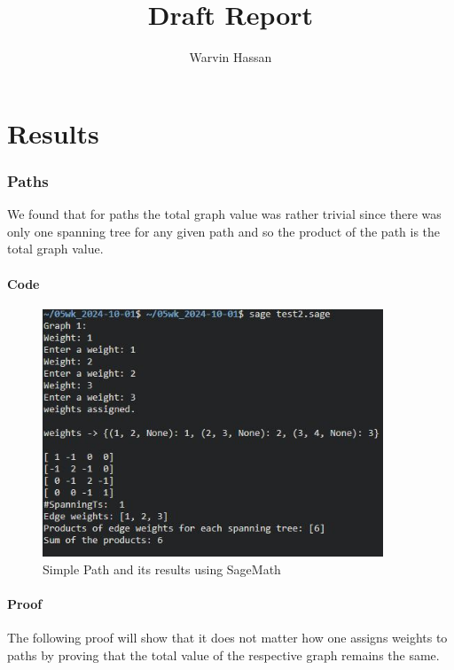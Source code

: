 \documentclass[12pt,letterpaper]{article}
\title{Draft Report}
\author{Warvin Hassan}
\begin{document}
\maketitle
\pagebreak
\tableofcontents
\pagebreak

\part{Results}

\section{Paths}  \label{P}

We found that for paths the total graph value was rather trivial since there was only one spanning tree for any given path and so the product of the path is the total graph value.

\subsection{Code}

	\begin{figure}[hbt!]  
		\begin{center}
		\includegraphics[width=4in]{f1.1.jpg}
		\end{center}
		\caption{\label{OrBx} Simple Path and its results using SageMath}
	\end{figure}
	

  
\subsection{Proof}
The following proof will show that it does not matter how one assigns weights to paths by proving that the total value of the respective graph remains the same.\\
\end{document}
